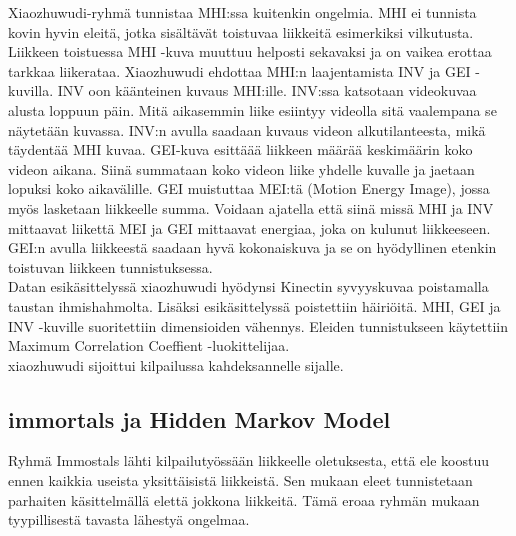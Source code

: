 Xiaozhuwudi-ryhmä tunnistaa MHI:ssa kuitenkin ongelmia. MHI ei tunnista kovin hyvin eleitä, jotka sisältävät toistuvaa liikkeitä esimerkiksi vilkutusta.
Liikkeen toistuessa MHI -kuva muuttuu helposti sekavaksi ja on vaikea erottaa tarkkaa liikerataa. Xiaozhuwudi ehdottaa MHI:n laajentamista INV ja GEI -kuvilla.
INV oon käänteinen kuvaus MHI:ille. INV:ssa katsotaan videokuvaa alusta loppuun päin.
Mitä aikasemmin liike esiintyy videolla sitä vaalempana se näytetään kuvassa. INV:n avulla saadaan kuvaus videon alkutilanteesta, mikä täydentää MHI kuvaa. 
GEI-kuva esittäää liikkeen määrää keskimäärin koko videon aikana. Siinä summataan koko videon liike yhdelle kuvalle ja jaetaan lopuksi koko aikavälille.
GEI muistuttaa MEI:tä (Motion Energy Image), jossa myös lasketaan liikkeelle summa. Voidaan ajatella että siinä missä MHI ja INV mittaavat liikettä 
MEI ja GEI mittaavat energiaa, joka on kulunut liikkeeseen. GEI:n avulla liikkeestä saadaan hyvä kokonaiskuva ja se on hyödyllinen etenkin toistuvan
liikkeen tunnistuksessa. \citep {6239179} \\

Datan esikäsittelyssä xiaozhuwudi hyödynsi Kinectin syvyyskuvaa poistamalla taustan ihmishahmolta. Lisäksi esikäsittelyssä poistettiin häiriöitä.
MHI, GEI ja INV -kuville suoritettiin dimensioiden vähennys. Eleiden tunnistukseen käytettiin Maximum Correlation Coeffient -luokittelijaa. \citep {6239179}\\

xiaozhuwudi sijoittui kilpailussa kahdeksannelle sijalle. 



\subsection{immortals ja Hidden Markov Model}

Ryhmä Immostals lähti kilpailutyössään liikkeelle oletuksesta, että ele koostuu ennen kaikkia useista yksittäisistä liikkeistä. 
Sen mukaan eleet tunnistetaan parhaiten käsittelmällä elettä jokkona liikkeitä. Tämä eroaa ryhmän mukaan tyypillisestä 
tavasta lähestyä ongelmaa.\\


